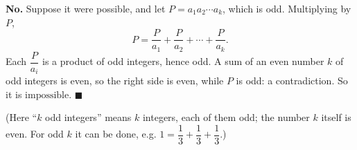 \textbf{No.} Suppose it were possible, and let $P=a_1a_2\cdots a_k$, which is odd. Multiplying by $P$,
\[P=\dfrac P{a_1}+\dfrac P{a_2}+\cdots+\dfrac P{a_k}.\]
Each $\dfrac P{a_i}$ is a product of odd integers, hence odd. A sum of an even number $k$ of odd integers is even, so the right side is even, while $P$ is odd: a contradiction. So it is $\boxed{\text{impossible}}$. $\blacksquare$

(Here ``$k$ odd integers'' means $k$ integers, each of them odd; the number $k$ itself is even. For odd $k$ it can be done, e.g. $1=\dfrac13+\dfrac13+\dfrac13$.)

